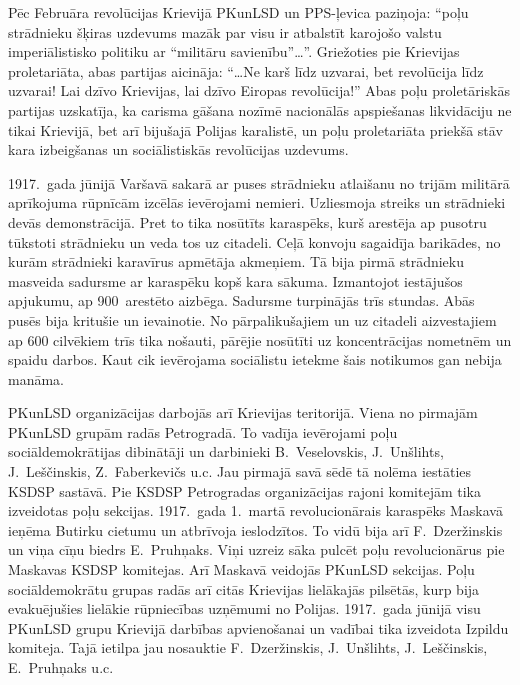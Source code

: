 \documentclass[twoside,a5paper,12pt,fleqn,openany]{extbook}
\begin{document}
Pēc Februāra revolūcijas Krievijā PKunLSD un PPS-ļevica paziņoja: ``poļu strādnieku šķiras uzdevums mazāk par visu ir atbalstīt karojošo valstu imperiālistisko politiku ar ``militāru savienību''\dots{}''. Griežoties pie Krievijas proletariāta, abas partijas aicināja: ``\dots{}Ne karš līdz uzvarai, bet revolūcija līdz uzvarai! Lai dzīvo Krievijas, lai dzīvo Eiropas revolūcija!'' Abas poļu proletāriskās partijas uzskatīja, ka carisma gāšana nozīmē nacionālās apspiešanas likvidāciju ne tikai Krievijā, bet arī bijušajā Polijas karalistē, un poļu proletariāta priekšā stāv kara izbeigšanas un sociālistiskās revolūcijas uzdevums.

1917.~gada jūnijā Varšavā sakarā ar puses strādnieku atlaišanu no trijām militārā aprīkojuma rūpnīcām izcēlās ievērojami nemieri. Uzliesmoja streiks un strādnieki devās demonstrācijā. Pret to tika nosūtīts karaspēks, kurš arestēja ap pusotru tūkstoti strādnieku un veda tos uz citadeli. Ceļā konvoju sagaidīja barikādes, no kurām strādnieki karavīrus apmētāja akmeņiem. Tā bija pirmā strādnieku masveida sadursme ar karaspēku kopš kara sākuma. Izmantojot iestājušos apjukumu, ap 900~arestēto aizbēga. Sadursme turpinājās trīs stundas. Abās pusēs bija kritušie un ievainotie. No pārpalikušajiem un uz citadeli aizvestajiem ap 600 cilvēkiem trīs tika nošauti, pārējie nosūtīti uz koncentrācijas nometnēm un spaidu darbos. Kaut cik ievērojama sociālistu ietekme šais notikumos gan nebija manāma.

PKunLSD organizācijas darbojās arī Krievijas teritorijā. Viena no pirmajām PKunLSD grupām radās Petrogradā. To vadīja ievērojami poļu sociāldemokrātijas dibinātāji un darbinieki B.~Veselovskis, J.~Unšlihts, J.~Leščinskis, Z.~Faberkevičs u.c. Jau pirmajā savā sēdē tā nolēma iestāties KSDSP sastāvā. Pie KSDSP Petrogradas organizācijas rajoni komitejām tika izveidotas poļu sekcijas. 1917.~gada 1.~martā revolucionārais karaspēks Maskavā ieņēma Butirku cietumu un atbrīvoja ieslodzītos. To vidū bija arī F.~Dzeržinskis un viņa cīņu biedrs E.~Pruhņaks. Viņi uzreiz sāka pulcēt poļu revolucionārus pie Maskavas KSDSP komitejas. Arī Maskavā veidojās PKunLSD sekcijas. Poļu sociāldemokrātu grupas radās arī citās Krievijas lielākajās pilsētās, kurp bija evakuējušies lielākie rūpniecības uzņēmumi no Polijas. 1917.~gada jūnijā visu PKunLSD grupu Krievijā darbības apvienošanai un vadībai tika izveidota Izpildu komiteja. Tajā ietilpa jau nosauktie F.~Dzeržinskis, J.~Unšlihts, J.~Leščinskis, E.~Pruhņaks u.c.
\end{document}
